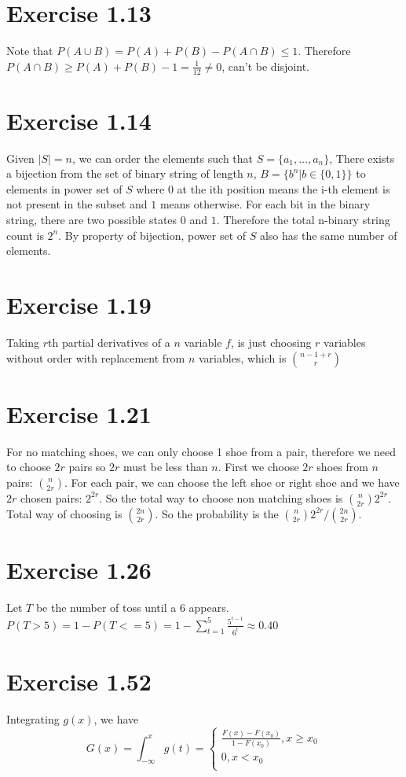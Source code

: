 \documentclass[12pt]{article}
\begin{document}
\section*{Exercise 1.13}
Note that $P(A\cup B) = P(A) + P(B) - P(A\cap B) \leq 1$. Therefore $P(A\cap B) \geq P(A) + P(B) - 1 =\frac{1}{12} \neq 0$, can't be disjoint.

\section*{Exercise 1.14}
Given $|S| = n$, we can order the elements such that $S=\{a_1,\ldots, a_n\}$, There exists a bijection from the set of binary string of length $n$, $B = \{b^n|b\in \{0,1\}\}$ to elements in power set of $S$ where $0$ at the ith position means the i-th element is not present in the subset and $1$ means otherwise.  For each bit in the binary string, there are two possible states $0$ and $1$. Therefore the total n-binary string count is $2^n$. By property of bijection, power set of $S$ also has the same number of elements.

\section*{Exercise 1.19}
Taking $r$th partial derivatives of a $n$ variable $f$, is just choosing $r$ variables without order with replacement from $n$ variables, which is ${n-1 + r \choose r}$

\section*{Exercise 1.21}
For no matching shoes, we can only choose 1 shoe from a pair, therefore we need to choose $2r$ pairs so $2r$ must be less than $n$. First we choose $2r$ shoes from $n$ pairs: ${n \choose 2r}$. For each pair, we can choose the left shoe or right shoe and we have $2r$ chosen pairs: $2^{2r}$. So the total way to choose non matching shoes is ${n \choose 2r} 2^{2r}$.  Total way of choosing is ${2n \choose 2r}$. So the probability is the ${n \choose 2r} 2^{2r} / {2n \choose 2r}$.

\section*{Exercise 1.26}
Let $T$ be the number of toss until a $6$ appears.
$P(T > 5) = 1- P(T <= 5) = 1 - \sum_{t=1}^5 \frac{5^{t-1}}{6^t} \approx 0.40$

\section*{Exercise 1.52}
Integrating $g(x)$, we have
\begin{equation*}
 G(x) = \int_{-\infty}^x g(t) = \begin{cases}
       \frac{F(x) - F(x_0)}{1-F(x_0)}, x \geq x_0 \\
       0, x < x_0 \\
     \end{cases}
\end{equation*}
\end{document}

